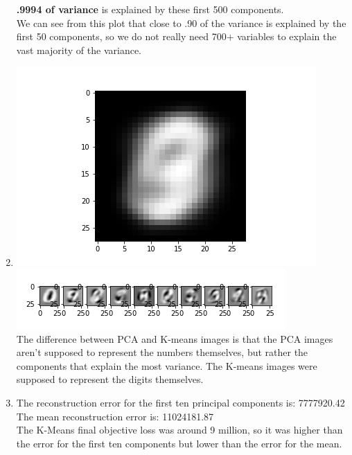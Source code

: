 \documentclass[submit]{harvardml}
\begin{document}
\begin{enumerate}
    \textbf{.9994 of variance} is explained by these first 500 components. \\
    We can see from this plot that close to .90 of the variance is explained by the first 50 components, so we do not really need 700+ variables to explain the vast majority of the variance.
    \item \includegraphics[scale = .5]{MeanImage (2).png}\\
    \includegraphics[]{FirstTenImg (1).png}\\
    The difference between PCA and K-means images is that the PCA images aren't supposed to represent the numbers themselves, but rather the components that explain the most variance. The K-means images were supposed to represent the digits themselves.
    \item The reconstruction error for the first ten principal components is: 7777920.42 \\
    
    The mean reconstruction error is: 11024181.87\\
    
    The K-Means final objective loss was around 9 million, so it was higher than the error for the first ten components but lower than the error for the mean.

\end{enumerate}
\newpage
\end{document}
